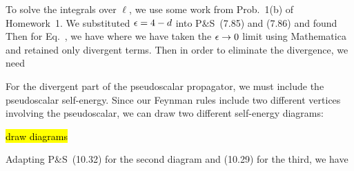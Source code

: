 \documentclass[11pt]{article}
\begin{document}
{	
	To solve the integrals over $\ell$, we use some work from Prob.~1(b) of Homework~1.  We substituted $\epsilon = 4 - d$ into P\&S~(7.85) and (7.86) and found
	Then for Eq.~, we have
	where we have taken the $\epsilon \to 0$ limit using Mathematica and retained only divergent terms.   Then in order to eliminate the divergence, we need
	
	For the divergent part of the pseudoscalar propagator, we must include the pseudoscalar self-energy.  Since our Feynman rules include two different vertices involving the pseudoscalar, we can draw two different self-energy diagrams:
	
	\hl{draw diagrams}
	
	Adapting P\&S~(10.32) for the second diagram and (10.29) for the third, we have
	
}
\end{document}
